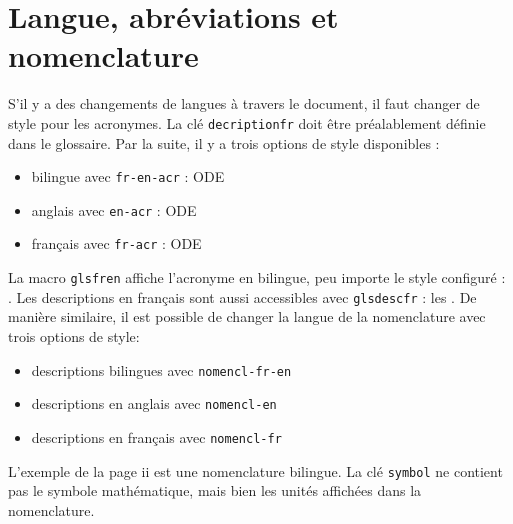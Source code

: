 \documentclass[PhD,nohyperref,english,french]{ulthese}
\begin{document}
\section{Langue, abréviations et nomenclature}

S'il y a des changements de langues à travers le document, il faut changer de style pour les acronymes. La clé \texttt{decriptionfr} doit être préalablement définie dans le glossaire. Par la suite, il y a trois options de style disponibles : 
\begin{itemize}
	 \item bilingue  avec \texttt{fr-en-acr}  : \acrfull{ODE}
	 \item anglais avec \texttt{en-acr} : \acrfull{ODE}
	  \item français avec \texttt{fr-acr} : \acrfull{ODE}
\end{itemize}
La macro \texttt{glsfren} affiche l'acronyme en bilingue, peu importe le style configuré : . Les descriptions en français sont aussi accessibles avec \texttt{glsdescfr} : les . De manière similaire, il est possible de changer la langue de la nomenclature avec trois options de style:
\begin{itemize}
	\item descriptions bilingues avec \texttt{nomencl-fr-en}
	\item descriptions en anglais avec \texttt{nomencl-en}
	\item descriptions en français avec \texttt{nomencl-fr}
\end{itemize}
L'exemple de la page ii est une nomenclature bilingue. La clé \texttt{symbol} ne contient pas le symbole mathématique, mais bien les unités affichées dans la nomenclature.
\end{document}
